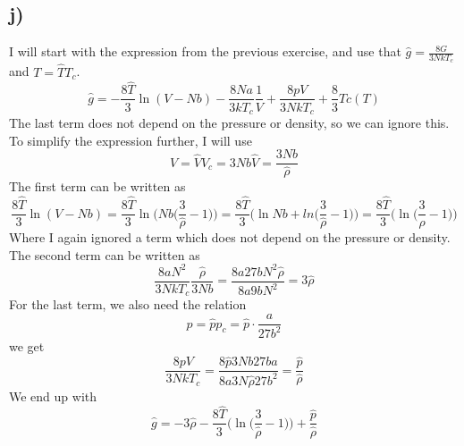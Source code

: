 \documentclass{scrartcl}
\begin{document}
\subsection*{j)}
I will start with the expression from the previous exercise, and use that $\hat{g}=\frac{8G}{3NkT_c}$ and $T=\hat{T}T_c$.
\begin{equation*}
\hat{g}=-\frac{8\hat{T}}{3}\ln(V-Nb)-\frac{8Na}{3kT_c}\frac{1}{V}+\frac{8pV}{3NkT_c}+\frac{8}{3}\hat{T}c(T)
\end{equation*}
The last term does not depend on the pressure or density, so we can ignore this. To simplify the expression further, I will use
\begin{equation*}
V=\hat{V}V_c=3Nb\hat{V}=\frac{3Nb}{\hat{\rho}}
\end{equation*}
The first term can be written as
\begin{equation*}
\frac{8\hat{T}}{3}\ln(V-Nb)=\frac{8\hat{T}}{3}\ln\Bigg(Nb\bigg(\frac{3}{\hat{\rho}}-1\bigg)\Bigg)=\frac{8\hat{T}}{3}\Bigg(\ln Nb+ln\bigg(\frac{3}{\hat{\rho}}-1\bigg)\Bigg)=\frac{8\hat{T}}{3}\Bigg(\ln\bigg(\frac{3}{\hat{\rho}}-1\bigg)\Bigg)
\end{equation*}
Where I again ignored a term which does not depend on the pressure or density. The second term can be written as
\begin{equation*}
\frac{8aN^2}{3NkT_c}\frac{\hat{\rho}}{3Nb}=\frac{8a27bN^2\hat{\rho}}{8a9bN^2}=3\hat{\rho}
\end{equation*}
For the last term, we also need the relation
\begin{equation*}
p=\hat{p}p_c=\hat{p}\cdot \frac{a}{27b^2}
\end{equation*}
we get
\begin{equation*}
\frac{8pV}{3NkT_c}=\frac{8\hat{p}3Nb27ba}{8a3N\hat{\rho}27b^2}=\frac{\hat{p}}{\hat{\rho}}
\end{equation*}
We end up with 
\begin{equation}
\hat{g}=-3\hat{\rho}-\frac{8\hat{T}}{3}\Bigg(\ln\bigg(\frac{3}{\hat{\rho}}-1\bigg)\Bigg)+\frac{\hat{p}}{\hat{\rho}}
\end{equation}
\end{document}
